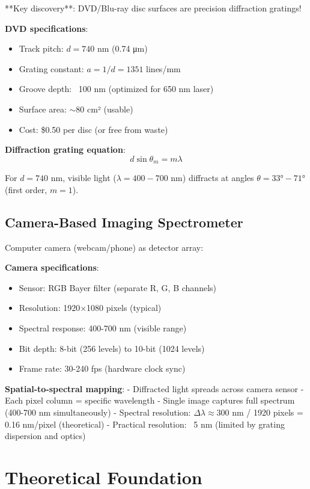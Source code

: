 \documentclass[12pt,a4paper]{article}
\begin{document}
**Key discovery**: DVD/Blu-ray disc surfaces are precision diffraction gratings!

\textbf{DVD specifications}:
\begin{itemize}
\item Track pitch: $d = 740$ nm (0.74 μm)
\item Grating constant: $a = 1/d = 1351$ lines/mm
\item Groove depth: ~100 nm (optimized for 650 nm laser)
\item Surface area: $\sim 80$ cm² (usable)
\item Cost: \$0.50 per disc (or free from waste)
\end{itemize}

\textbf{Diffraction grating equation}:
\begin{equation}
d\sin\theta_m = m\lambda
\end{equation}

For $d = 740$ nm, visible light ($\lambda = 400-700$ nm) diffracts at angles $\theta = 33°-71°$ (first order, $m=1$).

\subsection{Camera-Based Imaging Spectrometer}

Computer camera (webcam/phone) as detector array:

\textbf{Camera specifications}:
\begin{itemize}
\item Sensor: RGB Bayer filter (separate R, G, B channels)
\item Resolution: 1920×1080 pixels (typical)
\item Spectral response: 400-700 nm (visible range)
\item Bit depth: 8-bit (256 levels) to 10-bit (1024 levels)
\item Frame rate: 30-240 fps (hardware clock sync)
\end{itemize}

\textbf{Spatial-to-spectral mapping}:
- Diffracted light spreads across camera sensor
- Each pixel column = specific wavelength
- Single image captures full spectrum (400-700 nm simultaneously)
- Spectral resolution: $\Delta\lambda \approx 300$ nm / 1920 pixels = 0.16 nm/pixel (theoretical)
- Practical resolution: ~5 nm (limited by grating dispersion and optics)

\section{Theoretical Foundation}
\end{document}
